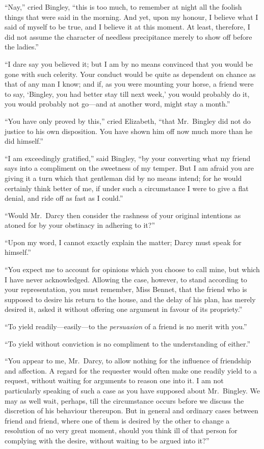 \documentclass[12pt,english]{book}
\begin{document}
{}``Nay,'' cried Bingley, {}``this is too much, to remember at
night all the foolish things that were said in the morning. And yet,
upon my honour, I believe what I said of myself to be true, and I
believe it at this moment. At least, therefore, I did not assume the
character of needless precipitance merely to show off before the ladies.''

{}``I dare say you believed it; but I am by no means convinced that
you would be gone with such celerity. Your conduct would be quite
as dependent on chance as that of any man I know; and if, as you were
mounting your horse, a friend were to say, `Bingley, you had better
stay till next week,' you would probably do it, you would probably
not go\mbox{---}and at another word, might stay a month.''

{}``You have only proved by this,'' cried Elizabeth, {}``that Mr.\ 
Bingley did not do justice to his own disposition. You have shown
him off now much more than he did himself.''

{}``I am exceedingly gratified,'' said Bingley, {}``by your converting
what my friend says into a compliment on the sweetness of my temper.
But I am afraid you are giving it a turn which that gentleman did
by no means intend; for he would certainly think better of me, if
under such a circumstance I were to give a flat denial, and ride off
as fast as I could.''

{}``Would Mr.\ Darcy then consider the rashness of your original
intentions as atoned for by your obstinacy in adhering to it?''\ 

{}``Upon my word, I cannot exactly explain the matter; Darcy must
speak for himself.''

{}``You expect me to account for opinions which you choose to call
mine, but which I have never acknowledged. Allowing the case, however,
to stand according to your representation, you must remember, Miss
Bennet, that the friend who is supposed to desire his return to the
house, and the delay of his plan, has merely desired it, asked it
without offering one argument in favour of its propriety.''

{}``To yield readily\mbox{---}easily\mbox{---}to the \textit{persuasion}
of a friend is no merit with you.''

{}``To yield without conviction is no compliment to the understanding
of either.''

{}``You appear to me, Mr.\ Darcy, to allow nothing for the influence
of friendship and affection. A regard for the requester would often
make one readily yield to a request, without waiting for arguments
to reason one into it. I am not particularly speaking of such a case
as you have supposed about Mr.\ Bingley. We may as well wait, perhaps,
till the circumstance occurs before we discuss the discretion of his
behaviour thereupon. But in general and ordinary cases between friend
and friend, where one of them is desired by the other to change a
resolution of no very great moment, should you think ill of that person
for complying with the desire, without waiting to be argued into it?''\ 
\end{document}
